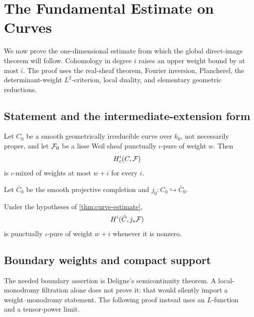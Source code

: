\chapter{The Fundamental Estimate on Curves}
\label{chap:curve-estimate}

We now prove the one-dimensional estimate from which the global
direct-image theorem will follow.  Cohomology in degree \(i\) raises an
upper weight bound by at most \(i\).  The proof uses the real-sheaf
theorem, Fourier inversion, Plancherel, the determinant-weight
\(L^2\)-criterion, local duality, and elementary geometric reductions.

\section{Statement and the intermediate-extension form}

\begin{theorem}
\label{thm:curve-estimate}
Let \(C_0\) be a smooth geometrically irreducible curve over \(k_0\),
not necessarily proper, and let \(\mathcal F_0\) be a lisse Weil sheaf
punctually \(\iota\)-pure of weight \(w\).  Then
\[
  H_c^i(C,\mathcal F)
\]
is \(\iota\)-mixed of weights at most \(w+i\) for every \(i\).
\end{theorem}

Let \(\bar C_0\) be the smooth projective completion and
\(j_0:C_0\hookrightarrow\bar C_0\).

\begin{theorem}
\label{thm:curve-intersection-purity}
Under the hypotheses of \cref{thm:curve-estimate},
\[
 H^i(\bar C,j_*\mathcal F)
\]
is punctually \(\iota\)-pure of weight \(w+i\) whenever it is nonzero.
\end{theorem}

\section{Boundary weights and compact support}

The needed boundary assertion is Deligne's semicontinuity theorem.  A
local-monodromy filtration alone does not prove it: that would silently
import a weight--monodromy statement.  The following proof instead uses
an \(L\)-function and a tensor-power limit.

